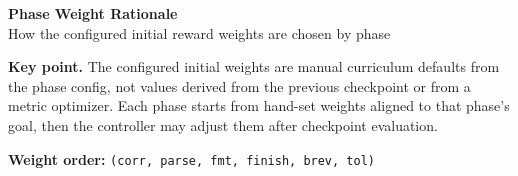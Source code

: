 \documentclass[11pt]{article}
\newcommand{\code}[1]{\texttt{#1}}
\begin{document}
\begin{center}
{\LARGE \textbf{Phase Weight Rationale}}\\[0.5em]
{\large How the configured initial reward weights are chosen by phase}\\[0.75em]
\end{center}

\noindent\textbf{Key point.}
The configured initial weights are manual curriculum defaults from the phase config, not values derived from the previous checkpoint or from a metric optimizer.
Each phase starts from hand-set weights aligned to that phase's goal, then the controller may adjust them after checkpoint evaluation.

\vspace{0.5em}
\noindent\textbf{Weight order:}
\code{(corr, parse, fmt, finish, brev, tol)}
\end{document}
